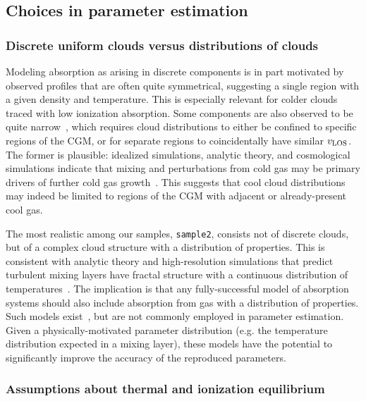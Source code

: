\documentclass[fleqn,usenatbib]{mnras}
\begin{document}
\subsection{Choices in parameter estimation}
\label{s: discussion -- modeling choices}

\subsubsection{Discrete uniform clouds versus distributions of clouds}

Modeling absorption as arising in discrete components is in part motivated by observed profiles that are often quite symmetrical,
suggesting a single region with a given density and temperature. 
This is especially relevant for colder clouds traced with low ionization absorption.
Some components are also observed to be quite narrow~\citep[e.g.][]{churchill1999Population, churchill2001Kinematics}, 
which requires cloud distributions to either be confined to specific regions of the CGM,
or for separate regions to coincidentally have similar $v_{\rm LOS}$.
The former is plausible:
idealized simulations, analytic theory, and cosmological simulations indicate that mixing and perturbations from cold gas may be primary drivers of further cold gas growth~\citep[e.g.][]{nelson2020Resolving, esmerian2021Thermal, Gronke.etal.2022, gronke2022Cooling, ramesh2022Circumgalactic, saeedzadeh2023Cool}.
This suggests that cool cloud distributions may indeed be limited to regions of the CGM with adjacent or already-present cool gas.

The most realistic among our samples, \texttt{sample2}, consists not of discrete clouds, but of a complex cloud structure with a distribution of properties.
This is consistent with analytic theory and high-resolution simulations that predict turbulent mixing layers have fractal structure with a continuous distribution of temperatures~\citep[e.g.][]{tan2021Model}.
The implication is that any fully-successful model of absorption systems should also include absorption from gas with a distribution of properties.
Such models exist~\citep[e.g.][]{stern2016Universal}, but are not commonly employed in parameter estimation.
Given a physically-motivated parameter distribution (e.g. the temperature distribution expected in a mixing layer), these models have the potential to significantly improve the accuracy of the reproduced parameters.

\subsubsection{Assumptions about thermal and ionization equilibrium}
\end{document}
